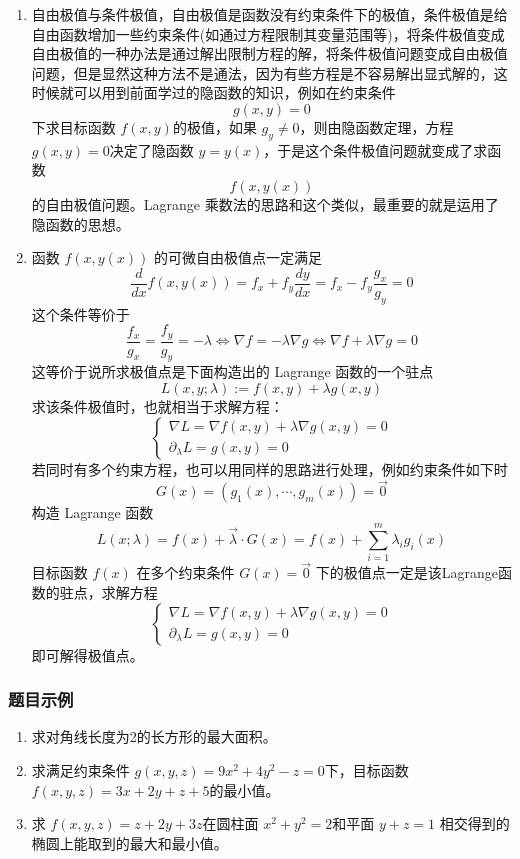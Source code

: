 \begin{enumerate}
    \item 自由极值与条件极值，自由极值是函数没有约束条件下的极值，条件极值是给自由函数增加一些约束条件(如通过方程限制其变量范围等)，将条件极值变成自由极值的一种办法是通过解出限制方程的解，将条件极值问题变成自由极值问题，但是显然这种方法不是通法，因为有些方程是不容易解出显式解的，这时候就可以用到前面学过的隐函数的知识，例如在约束条件
    $$
    g(x,y)=0
    $$
    下求目标函数 $f(x,y)$的极值，如果 $g_y \neq 0 $，则由隐函数定理，方程 $g(x,y)=0$决定了隐函数 $y=y(x)$，于是这个条件极值问题就变成了求函数
    $$
    f(x,y(x))
    $$
    的自由极值问题。Lagrange 乘数法的思路和这个类似，最重要的就是运用了隐函数的思想。

    \item 函数 $f(x,y(x))$ 的可微自由极值点一定满足
    $$
    \frac d{dx}f(x,y(x))=f_x+f_y\frac{dy}{dx}=f_x-f_y\frac{g_x}{g_y}=0
    $$
    这个条件等价于
    $$
    \frac{f_x}{g_x}=\frac{f_y}{g_y}=-\lambda \Leftrightarrow\nabla f= - \lambda\nabla g \Leftrightarrow \nabla f + \lambda\nabla g = 0
    $$
    这等价于说所求极值点是下面构造出的 Lagrange 函数的一个驻点
    $$
    L(x,y;\lambda):=f(x,y)+\lambda g(x,y)
    $$
    求该条件极值时，也就相当于求解方程：
    $$
    \begin{cases}
    \nabla L=\nabla f(x,y)+\lambda\nabla g(x,y)=0 \\
    \partial_\lambda L=g(x,y)=0 
    \end{cases}
    $$
    若同时有多个约束方程，也可以用同样的思路进行处理，例如约束条件如下时
    $$
    G(x)=(g_1(x),\cdots,g_m(x))=\vec{0}
    $$
    构造 Lagrange 函数
    $$
    L(x;\lambda)=f(x)+\vec{\lambda}\cdot G(x)=f(x)+\sum_{i=1}^m\lambda_ig_i(x)
    $$
    目标函数 $f(x)$ 在多个约束条件 $G(x) = \vec{0}$ 下的极值点一定是该Lagrange函数的驻点，求解方程
    $$
    \begin{cases}\nabla L=\nabla f(x,y)+\lambda\nabla g(x,y)=0 \\
    \partial_\lambda L=g(x,y)=0
    \end{cases}
    $$
    即可解得极值点。
\end{enumerate}

\subsubsection{题目示例}
\begin{enumerate}
    \item 求对角线长度为2的长方形的最大面积。
    
    \item 求满足约束条件 $g(x,y,z) = 9x^2 + 4y^2 - z =0$下，目标函数 $f(x,y,z) = 3 x + 2y+z +5$的最小值。

    \item 求 $f(x,y,z)=z + 2y + 3z$在圆柱面 $x^2+y^2=2$和平面 $y+z=1$ 相交得到的椭圆上能取到的最大和最小值。
\end{enumerate}

